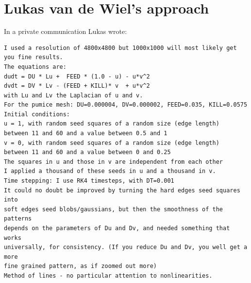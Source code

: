 \section*{Lukas van de Wiel's approach}

In a private communication Lukas wrote:
{\small 
\begin{verbatim}
I used a resolution of 4800x4800 but 1000x1000 will most likely get you fine results.
The equations are:
dudt = DU * Lu +  FEED * (1.0 - u) - u*v^2
dvdt = DV * Lv - (FEED + KILL)* v  + u*v^2
with Lu and Lv the Laplacian of u and v.
For the pumice mesh: DU=0.000004, DV=0.000002, FEED=0.035, KILL=0.0575
Initial conditions:
u = 1, with random seed squares of a random size (edge length) 
between 11 and 60 and a value between 0.5 and 1
v = 0, with random seed squares of a random size (edge length) 
between 11 and 60 and a value between 0 and 0.25
The squares in u and those in v are independent from each other
I applied a thousand of these seeds in u and a thousand in v.
Time stepping: I use RK4 timesteps, with DT=0.001
It could no doubt be improved by turning the hard edges seed squares into 
soft edges seed blobs/gaussians, but then the smoothness of the patterns
depends on the parameters of Du and Dv, and needed something that works 
universally, for consistency. (If you reduce Du and Dv, you well get a more 
fine grained pattern, as if zoomed out more) 
Method of lines - no particular attention to nonlinearities. 
\end{verbatim}
}


